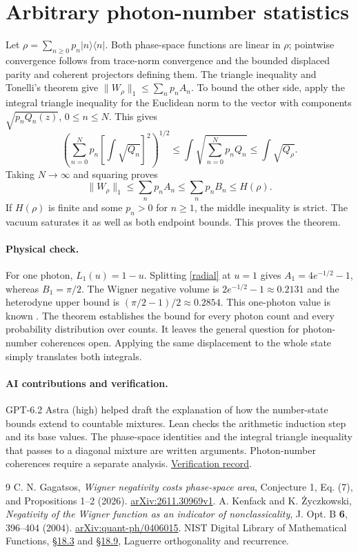 \documentclass[11pt]{article}
\newcommand{\ket}[1]{\lvert #1\rangle}
\begin{document}
\section{Arbitrary photon-number statistics}
Let $\rho=\sum_{n\ge0}p_n\ket n\!\langle n|$. Both phase-space functions are linear in $\rho$; pointwise convergence follows from trace-norm convergence and the bounded displaced parity and coherent projectors defining them. The triangle inequality and Tonelli's theorem give $\|W_\rho\|_1\le\sum_n p_n A_n$. To bound the other side, apply the integral triangle inequality for the Euclidean norm to the vector with components $\sqrt{p_nQ_n(z)}$, $0\le n\le N$. This gives
\[
 \left(\sum_{n=0}^N p_n\left[\int \sqrt{Q_n}\right]^2\right)^{1/2}
 \le \int\sqrt{\sum_{n=0}^N p_nQ_n}\le\int\sqrt{Q_\rho}.
\]
Taking $N\to\infty$ and squaring proves
\[
 \|W_\rho\|_1\le\sum_n p_n A_n\le\sum_n p_n B_n\le H(\rho).
\]
If $H(\rho)$ is finite and some $p_n>0$ for $n\ge1$, the middle inequality is strict. The vacuum saturates it as well as both endpoint bounds. This proves the theorem.

\paragraph{Physical check.}
For one photon, $L_1(u)=1-u$. Splitting \eqref{radial} at $u=1$ gives $A_1=4e^{-1/2}-1$, whereas $B_1=\pi/2$. The Wigner negative volume is $2e^{-1/2}-1\approx0.2131$ and the heterodyne upper bound is $(\pi/2-1)/2\approx0.2854$. This one-photon value is known \cite{kenfack}. The theorem establishes the bound for every photon count and every probability distribution over counts. It leaves the general question for photon-number coherences open. Applying the same displacement to the whole state simply translates both integrals.

\paragraph{AI contributions and verification.} GPT-6.2 Astra (high) helped draft the explanation of how the number-state bounds extend to countable mixtures. Lean checks the arithmetic induction step and its base values. The phase-space identities and the integral triangle inequality that passes to a diagonal mixture are written arguments. Photon-number coherences require a separate analysis. \href{https://github.com/shunyaekam/oo-research/blob/a5cde30636afbfe599efab6bf8bbbafe9c640c22/checks/phase-invariant-wigner.md}{Verification record}.

\begin{thebibliography}{9}
 C. N. Gagatsos, \emph{Wigner negativity costs phase-space area}, Conjecture 1, Eq. (7), and Propositions 1--2 (2026). \href{https://arxiv.org/abs/2611.30969}{arXiv:2611.30969v1}.
 A. Kenfack and K. {\.{Z}}yczkowski, \emph{Negativity of the Wigner function as an indicator of nonclassicality}, J. Opt. B \textbf{6}, 396--404 (2004). \href{https://arxiv.org/abs/quant-ph/0406015}{arXiv:quant-ph/0406015}.
 NIST Digital Library of Mathematical Functions, \href{https://dlmf.nist.gov/18.3}{\S18.3} and \href{https://dlmf.nist.gov/18.9}{\S18.9}, Laguerre orthogonality and recurrence.
\end{thebibliography}
\end{document}
